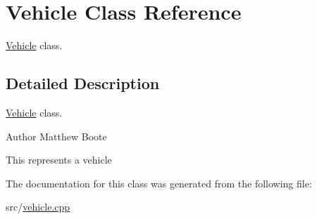 \hypertarget{classVehicle}{}\section{Vehicle Class Reference}
\label{classVehicle}


\hyperlink{classVehicle}{Vehicle} class.  




\subsection{Detailed Description}
\hyperlink{classVehicle}{Vehicle} class. 

\begin{DoxyAuthor}{Author}
Matthew Boote
\end{DoxyAuthor}
This represents a vehicle 

The documentation for this class was generated from the following file\+:\begin{DoxyCompactItemize}
\item 
src/\hyperlink{vehicle_8cpp}{vehicle.\+cpp}\end{DoxyCompactItemize}

